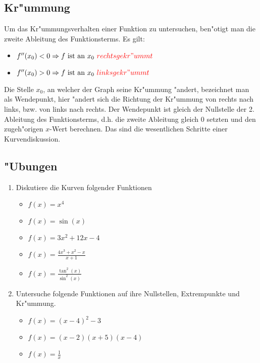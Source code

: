 \subsection{Kr"ummung}
Um das Kr"ummungsverhalten einer Funktion zu untersuchen, ben"otigt man die zweite Ableitung des Funktionsterms. Es gilt: 
 \begin{itemize}
 \item $f''(x_0)<0 \Rightarrow f \text{ ist an } x_0 \ \textcolor{red}{rechtsgekr"ummt} $
 \item $f''(x_0)>0 \Rightarrow f \text{ ist an } x_0 \ \textcolor{red}{linksgekr"ummt}$
 \end{itemize}
Die Stelle $x_0$, an welcher der Graph seine Kr"ummung "andert, bezeichnet man als Wendepunkt, hier "andert sich die Richtung der Kr"ummung von rechts nach links, bzw. von links nach rechts. Der Wendepunkt ist gleich der Nullstelle der 2. Ableitung des Funktionsterms, d.h. die zweite Ableitung gleich $0$ setzten und den zugeh"origen $x$-Wert berechnen. Das sind die wesentlichen Schritte einer Kurvendiskussion.

 \subsection{"Ubungen}
 \begin{enumerate}
 \item Diskutiere die Kurven folgender Funktionen
 \begin{itemize}
 \item $f(x)=x^4$
 \item $f(x)=\sin(x)$
 \item $f(x)=3x^2 + 12x - 4$
 \item $f(x)=\frac{4x^3 + x^2 - x}{x+1}$
 \item $f(x)=\frac{\tan^2(x)}{\sin^2(x)}$
 \end{itemize}
 \item Untersuche folgende Funktionen auf ihre Nullstellen, Extrempunkte und Kr"ummung.
 \begin{itemize}
 \item $f(x)=(x-4)^2-3$
 \item $f(x)=(x-2)(x+5)(x-4)$
 \item $f(x)=\frac{1}{x}$
 \end{itemize}
 \end{enumerate}
 
 